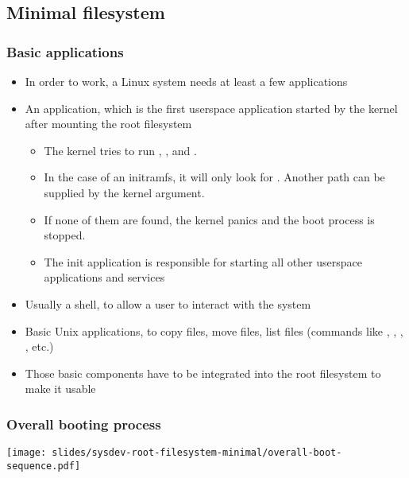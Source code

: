 \subsection{Minimal filesystem}
\begin{frame}
  \frametitle{Basic applications}
  \begin{itemize}
  \item In order to work, a Linux system needs at least a few
    applications
  \item An  application, which is the first userspace
    application started by the kernel after mounting the root
    filesystem
    \begin{itemize}
    \item The kernel tries to run , ,
       and .
    \item In the case of an initramfs, it will only look for
      . Another path can be supplied by the 
      kernel argument.
    \item If none of them are found, the kernel panics and the boot
      process is stopped.
    \item The init application is responsible for starting all other
      userspace applications and services
    \end{itemize}
  \item Usually a shell, to allow a user to interact with the system
  \item Basic Unix applications, to copy files, move files, list files
    (commands like , , , ,
    etc.)
  \item Those basic components have to be integrated into the root
    filesystem to make it usable
  \end{itemize}
\end{frame}

\begin{frame}
  \frametitle{Overall booting process}
  \begin{center}
    \texttt{[image: slides/sysdev-root-filesystem-minimal/overall-boot-sequence.pdf]}
  \end{center}
\end{frame}

